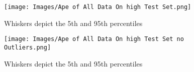\begin{figure}[h]
\texttt{[image: Images/Ape of All Data On high Test Set.png]}
\centering
\caption{Whiskers depict the 5th and 95th percentiles}
\label{fig:std_all_high_ape_outliers}
\end{figure}

\begin{figure}[h]
\texttt{[image: Images/Ape of All Data On high Test Set no Outliers.png]}
\centering
\caption{Whiskers depict the 5th and 95th percentiles}
\label{fig:std_all_high_ape}
\end{figure}